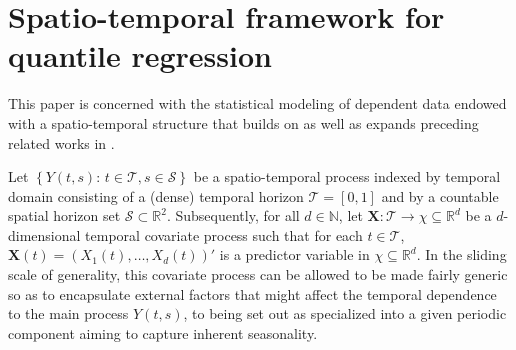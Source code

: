 \documentclass[aos]{imsart}
\theoremstyle{plain}
\theoremstyle{remark}
\def\R{\mathbb{R}}
\newcommand{\Scal}{\mathcal{S}}
\newcommand{\Tcal}{\mathcal{T}}
\newcommand{\bb}[1]{\boldsymbol{#1}}
\begin{document}
\section{Spatio-temporal framework for quantile regression}
\label{Sec:MainAssump}

This paper is concerned with the statistical modeling of dependent data endowed with a spatio-temporal structure that builds on as well as expands preceding related works in \cite{de2006multivariate,zhou2010nonparametric,deb2021nonparametric}.

Let $\left\{Y(t, s):\, t \in \Tcal, s \in \Scal \right\}$ be a spatio-temporal process indexed by temporal domain consisting of a (dense) temporal horizon $\Tcal = [0, 1]$ and by a countable spatial horizon set $\Scal \subset \R^2$. Subsequently, for all $d\in \mathbb{N}$, let $\bb{X}: \Tcal \rightarrow \chi \subseteq \R^d$ be a $d$-dimensional temporal covariate process such that for each $t \in \Tcal$, $\bb{X}(t) = \left(X_1(t), \ldots, X_d(t) \right)'$ is a predictor variable in $\chi \subseteq \R^d$. In the sliding scale of generality, this covariate process can be allowed to be made fairly generic so as to encapsulate external factors that might affect the temporal dependence to the main process $Y(t, s)$, to being set out as specialized into a given periodic component aiming to capture inherent seasonality.
\end{document}
